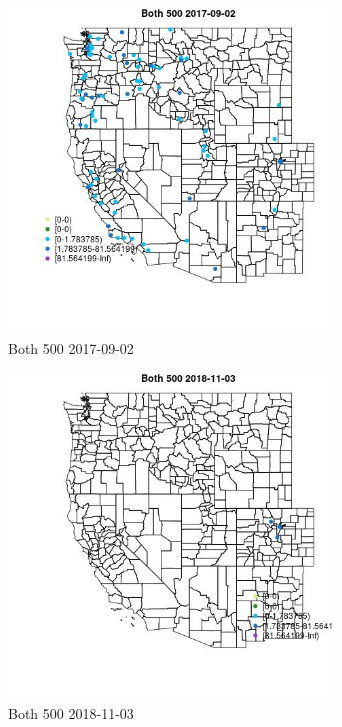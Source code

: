 \begin{figure} 
\centering  
\includegraphics[width=0.77\textwidth]{Code_Outputs/Report_ML_input_PM25_Step4_part_e_de_duplicated_aveswNAs_MapObsBoth_5002017-09-02.jpg} 
\caption{\label{fig:Report_ML_input_PM25_Step4_part_e_de_duplicated_aveswNAsMapObsBoth_5002017-09-02}Both 500 2017-09-02} 
\end{figure} 
 

\begin{figure} 
\centering  
\includegraphics[width=0.77\textwidth]{Code_Outputs/Report_ML_input_PM25_Step4_part_e_de_duplicated_aveswNAs_MapObsBoth_5002018-11-03.jpg} 
\caption{\label{fig:Report_ML_input_PM25_Step4_part_e_de_duplicated_aveswNAsMapObsBoth_5002018-11-03}Both 500 2018-11-03} 
\end{figure} 
 

